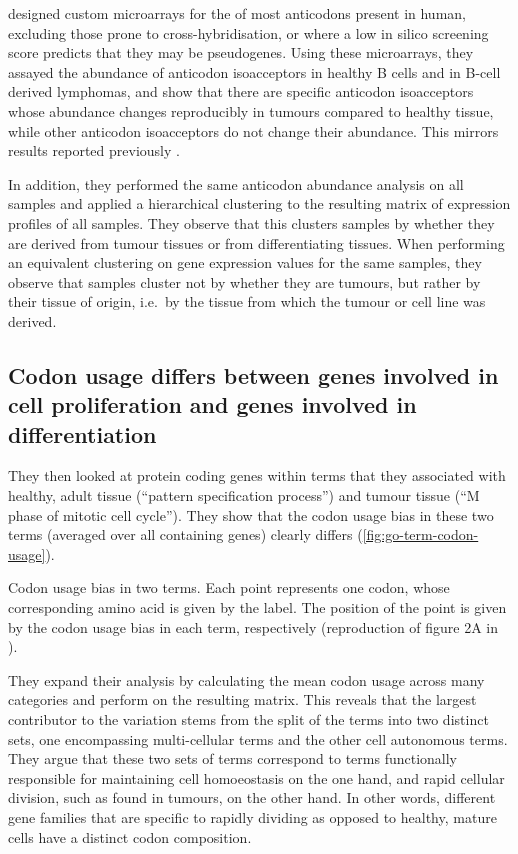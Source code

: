 \citet{Gingold:2014} designed custom microarrays for the \trna[s] of most
anticodons present in human, excluding those prone to cross-hybridi\-sation, or
where a low in silico screening score predicts that they may be pseudogenes.
Using these microarrays, they assayed the abundance of anticodon isoacceptors in
healthy B cells and in B-cell derived lymphomas, and show that there are
specific anticodon isoacceptors whose abundance changes reproducibly in tumours
compared to healthy tissue, while other anticodon isoacceptors do not change
their abundance. This mirrors results reported previously
\citep{Pavon-Eternod:2009}.

In addition, they performed the same \trna anticodon abundance analysis on all
samples and applied a hierarchical clustering to the resulting matrix of \trna
expression profiles of all samples. They observe that this clusters samples by
whether they are derived from tumour tissues or from differentiating tissues.
When performing an equivalent clustering on \mrna gene expression values for the
same samples, they observe that samples cluster not by whether they are tumours,
but rather by their tissue of origin, i.e.\ by the tissue from which the tumour
or cell line was derived.

\subsection{Codon usage differs between genes involved in cell proliferation and
genes involved in differentiation}

They then looked at protein coding genes within \go terms that they associated
with healthy, adult tissue (“pattern specification process”) and tumour tissue
(“M phase of mitotic cell cycle”). They show that the codon usage bias in these
two \go terms (averaged over all containing genes) clearly differs
(\cref{fig:go-term-codon-usage}).

    {Codon usage bias in two  terms.}
    {Each point represents one codon, whose corresponding amino acid is given by
    the label. The position of the point is given by the codon usage bias in
    each \go term, respectively (reproduction of figure 2A in
    \citet{Gingold:2014}).}

They expand their analysis by calculating the mean codon usage across many \go
categories and perform \pca on the resulting matrix. This reveals that the
largest contributor to the variation stems from the split of the \go terms into
two distinct sets, one encompassing multi-cellular \go terms and the other cell
autonomous \go terms. They argue that these two sets of \go terms correspond to
\go terms functionally responsible for maintaining cell homoeostasis on the one
hand, and rapid cellular division, such as found in tumours, on the other hand.
In other words, different gene families that are specific to rapidly dividing as
opposed to healthy, mature cells have a distinct codon composition.

